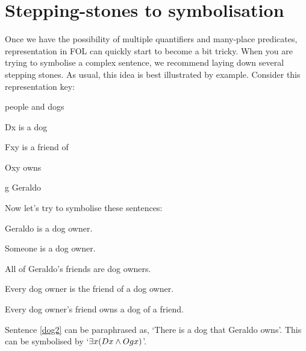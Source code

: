 

\section{Stepping-stones to symbolisation}
Once we have the possibility of multiple quantifiers and many-place predicates, representation in FOL can quickly start to become a bit tricky. When you are trying to symbolise a complex sentence, we recommend laying down several stepping stones. As usual, this idea is best illustrated by example. Consider this representation key:
\begin{ekey}
\item[\text{domain}] people and dogs
\item[Dx]  is a dog
\item[Fxy]  is a friend of 
\item[Oxy]  owns 
\item[g] Geraldo
\end{ekey}
Now let's try to symbolise these sentences:
\begin{earg}
\item[\ex{dog2}] Geraldo is a dog owner.
\item[\ex{dog3}] Someone is a dog owner.
\item[\ex{dog4}] All of Geraldo's friends are dog owners.
\item[\ex{dog5}] Every dog owner is the friend of a dog owner.
\item[\ex{dog6}] Every dog owner's friend owns a dog of a friend.
\end{earg}
Sentence \ref{dog2} can be paraphrased as, `There is a dog that Geraldo owns'. This can be symbolised by `$\exists x(Dx \wedge Ogx)$'.

